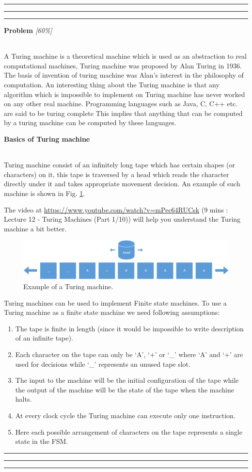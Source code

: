 \documentclass[a4paper,10pt]{article}
\theoremstyle{mytheor}
\newcounter{problemNumber}
\newcommand {
  \insertProblem}[2]{
  \vspace{0.5cm}
  \hrule \hrule \hrule
  \vspace{0.3cm}
  
  {
    \setlength{\parindent}{0}

    {
      \color{greatblue}
      \textbf{\Large{Problem \theproblemNumber}}
      \hfill
      \textit{[#1]}
    }

  }

  \vspace{6pt}\\#2

  \addtocounter{problemNumber}{1}

  \vspace{0.2cm}
  \hrule \hrule \hrule
  \vspace{0.5cm}
}
\newcommand{\problemheading}[1] {
  \vspace{0.3cm}

  {
    \setlength{\parindent}{0}
    \textbf{#1}
  }

  \vspace{0.05cm}
}
\newcommand{\amurl}[1]{%
  {\color{blue}\url{#1}}
}
\begin{document}
 \insertProblem {60\%} { A Turing machine is a theoretical machine which is
   used as an abstraction to real computational machines, Turing
   machine was proposed by Alan Turing in 1936. The basis of invention
   of turing machine was Alan's interest in the philosophy of
   computation. An interesting thing about the Turing machine is that
   any algorithm which is impossible to implement on Turing machine
   has never worked on any other real machine. Programming languages
   such as Java, C, C++ etc. are said to be turing complete This
   implies that anything that can be computed by a turing machine can
   be computed by these languages.

   \problemheading{Basics of Turing machine}\\ Turing machine consist
   of an infinitely long tape which has certain shapes (or characters)
   on it, this tape is traversed by a head which reads the character
   directly under it and takes appropriate movement decision. An
   example of such machine is shown in
   Fig. \ref{Fig:turing-machine-example}.

   The video at \amurl{https://www.youtube.com/watch?v=mPec64RUCsk} (9
   mins : Lecture 12 - Turing Machines (Part 1/10)) will help you
   understand the Turing machine a bit better.

  \begin{figure}[!h] \centering  
    \includegraphics[width=\linewidth]{./resources/turingMachine.pdf} 
    \caption{Example of a Turing machine.} 
    \label{Fig:turing-machine-example} 
  \end{figure}

  Turing machines can be used to implement Finite state machines. To use
  a Turing machine as a finite state machine we need following
  assumptions:
  \begin{enumerate}
  \item The tape is finite in length (since it would be impossible
    to write description of an infinite tape).
  \item Each character on the tape can only be `A', `+' or `\_' where
    `A' and `+' are used for decisions while `\_' represents an unused
    tape slot.
  \item The input to the machine will be the initial configuration
    of the tape while the output of the machine will be the state of
    the tape when the machine halts.
  \item At every clock cycle the Turing machine can execute only one
    instruction.
  \item Here each possible arrangement of characters on the tape
    represents a single state in the FSM.
  \end{enumerate}

}
\end{document}
